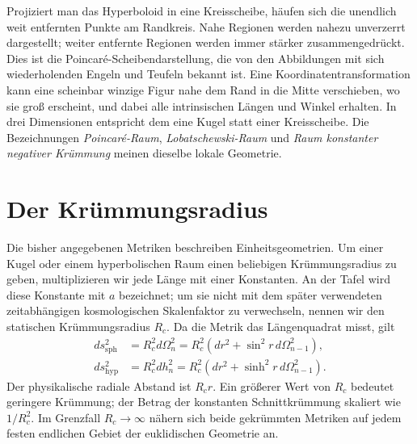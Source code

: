 Projiziert man das Hyperboloid in eine Kreisscheibe, häufen sich die unendlich weit entfernten Punkte am Randkreis. Nahe Regionen werden nahezu unverzerrt dargestellt; weiter entfernte Regionen werden immer stärker zusammengedrückt. Dies ist die Poincar\'e-Scheibendarstellung, die von den Abbildungen mit sich wiederholenden Engeln und Teufeln bekannt ist. Eine Koordinatentransformation kann eine scheinbar winzige Figur nahe dem Rand in die Mitte verschieben, wo sie groß erscheint, und dabei alle intrinsischen Längen und Winkel erhalten. In drei Dimensionen entspricht dem eine Kugel statt einer Kreisscheibe. Die Bezeichnungen \emph{Poincar\'e-Raum}, \emph{Lobatschewski-Raum} und \emph{Raum konstanter negativer Krümmung} meinen dieselbe lokale Geometrie.

\begin{classroomqa}\end{classroomqa}

\section{Der Krümmungsradius}

Die bisher angegebenen Metriken beschreiben Einheitsgeometrien. Um einer Kugel oder einem hyperbolischen Raum einen beliebigen Krümmungsradius zu geben, multiplizieren wir jede Länge mit einer Konstanten. An der Tafel wird diese Konstante mit \(a\) bezeichnet; um sie nicht mit dem später verwendeten zeitabhängigen kosmologischen Skalenfaktor zu verwechseln, nennen wir den statischen Krümmungsradius \(R_c\). Da die Metrik das Längenquadrat misst, gilt
\begin{align}
ds_{\mathrm{sph}}^2
  &=R_c^2d\Omega_n^2
   =R_c^2\left(dr^2+\sin^2r\,d\Omega_{n-1}^2\right),\\
ds_{\mathrm{hyp}}^2
  &=R_c^2dh_n^2
   =R_c^2\left(dr^2+\sinh^2r\,d\Omega_{n-1}^2\right).
\label{eq:c03-scaled-curvature}
\end{align}
Der physikalische radiale Abstand ist \(R_cr\). Ein größerer Wert von \(R_c\) bedeutet geringere Krümmung; der Betrag der konstanten Schnittkrümmung skaliert wie \(1/R_c^2\). Im Grenzfall \(R_c\to\infty\) nähern sich beide gekrümmten Metriken auf jedem festen endlichen Gebiet der euklidischen Geometrie an.

